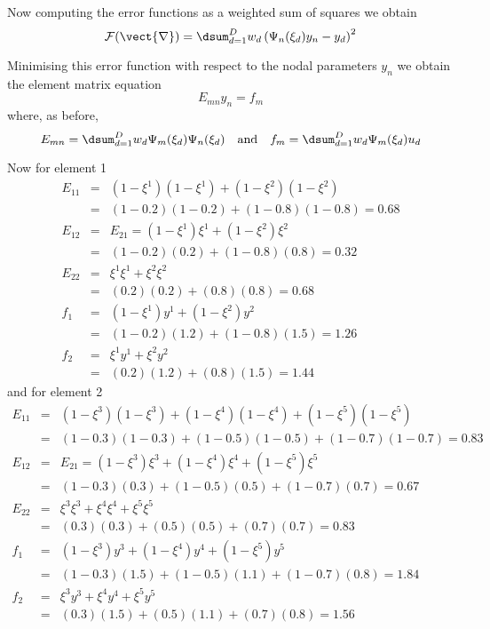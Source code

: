 Now computing the error functions as a weighted sum of squares we obtain
\begin{equation}
  {\cal F(\vect{r})}=\dsum_{d=1}^{D}w_{d}\left(\Psi_{n}(\xi_{d})y_{n}-y_{d}
  \right)^{2}
\end{equation}

Minimising this error function with respect to the nodal parameters $y_{n}$ we
obtain the element matrix equation
\begin{equation}
  E_{mn}y_{n}=f_{m}
\end{equation}
where, as before,
\begin{equation}
  E_{mn}=\dsum_{d=1}^{D}w_{d}\Psi_m(\xi_{d})\Psi_n(\xi_{d}) \quad \mbox{and} 
  \quad f_{m}=\dsum_{d=1}^{D}w_{d}\Psi_m(\xi_{d})u_{d}
\end{equation}

Now for element 1
\begin{equation}
  \begin{array}{rcl}
    E_{11}&=&(1-\xi^{1})(1-\xi^{1})+(1-\xi^{2})(1-\xi^{2}) \\
    &=&(1-0.2)(1-0.2)+(1-0.8)(1-0.8)=0.68 \\
    E_{12}&=&E_{21}=(1-\xi^{1})\xi^{1}+(1-\xi^{2})\xi^{2} \\
    &=&(1-0.2)(0.2)+(1-0.8)(0.8)=0.32 \\
    E_{22}&=&\xi^{1}\xi^{1}+\xi^{2}\xi^{2} \\
    &=& (0.2)(0.2)+(0.8)(0.8)=0.68 \\
    f_{1}&=&(1-\xi^{1})y^{1}+(1-\xi^{2})y^{2} \\
    &=&(1-0.2)(1.2)+(1-0.8)(1.5)=1.26 \\
    f_{2}&=&\xi^{1}y^{1}+\xi^{2}y^{2} \\
    &=&(0.2)(1.2)+(0.8)(1.5)=1.44
  \end{array}
\end{equation}
and for element 2
\begin{equation}
  \begin{array}{rcl}
    E_{11}&=&(1-\xi^{3})(1-\xi^{3})+(1-\xi^{4})(1-\xi^{4})+(1-\xi^{5})
    (1-\xi^{5})\\
    &=&(1-0.3)(1-0.3)+(1-0.5)(1-0.5)+(1-0.7)(1-0.7)=0.83 \\
    E_{12}&=&E_{21}=(1-\xi^{3})\xi^{3}+(1-\xi^{4})\xi^{4}+(1-\xi^{5})\xi^{5}\\
    &=&(1-0.3)(0.3)+(1-0.5)(0.5)+(1-0.7)(0.7)=0.67 \\
    E_{22}&=&\xi^{3}\xi^{3}+\xi^{4}\xi^{4}+\xi^{5}\xi^{5}\\
    &=&(0.3)(0.3)+(0.5)(0.5)+(0.7)(0.7)=0.83 \\
    f_{1}&=&(1-\xi^{3})y^{3}+(1-\xi^{4})y^{4}+(1-\xi^{5})y^{5}\\
    &=&(1-0.3)(1.5)+(1-0.5)(1.1)+(1-0.7)(0.8)=1.84\\
    f_{2}&=&\xi^{3}y^{3}+\xi^{4}y^{4}+\xi^{5}y^{5}\\
    &=&(0.3)(1.5)+(0.5)(1.1)+(0.7)(0.8)=1.56
  \end{array}
\end{equation}

